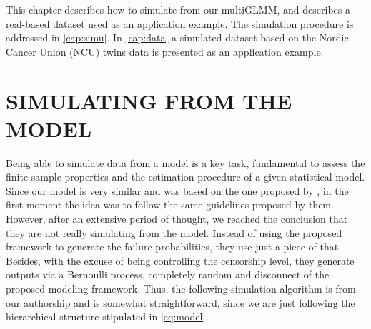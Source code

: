 This chapter describes how to simulate from our multiGLMM, and describes
a real-based dataset used as an application example. The simulation
procedure is addressed in \autoref{cap:simu}. In \autoref{cap:data} a
simulated dataset based on the Nordic Cancer Union (NCU) twins data is
presented as an application example.

\section{SIMULATING FROM THE MODEL}
\label{cap:simu}

Being able to simulate data from a model is a key task, fundamental to
assess the finite-sample properties and the estimation procedure of a
given statistical model. Since our model is very similar and was based
on the one proposed by , in the first moment the
idea was to follow the same guidelines proposed by them. However, after
an extensive period of thought, we reached the conclusion that they are
not really simulating from the model. Instead of using the proposed
framework to generate the failure probabilities, they use just a piece
of that. Besides, with the excuse of being controlling the censorship
level, they generate outputs via a Bernoulli process, completely random
and disconnect of the proposed modeling framework. Thus, the following
simulation algorithm is from our authorship and is somewhat
straightforward, since we are just following the hierarchical structure
stipulated in \autoref{eq:model}.

